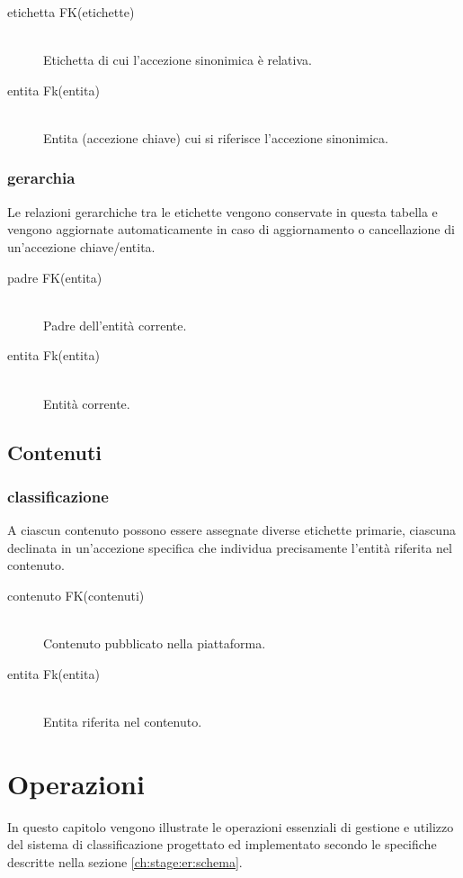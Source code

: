 \documentclass[10pt,a4paper,headinclude,footinclude,hidelinks]{scrreprt} %
\begin{document}
	\begin{description}
	\item[etichetta FK(etichette)] \hfill \\
	Etichetta di cui l'accezione sinonimica è relativa.
	\item[entita Fk(entita)] \hfill \\
	Entita (accezione chiave) cui si riferisce l'accezione sinonimica.
	\end{description}

	\subsection{gerarchia}
	Le relazioni gerarchiche tra le etichette vengono conservate in questa tabella e vengono aggiornate automaticamente in caso di aggiornamento o cancellazione di un'accezione chiave/entita.

	\begin{description}
	\item[padre FK(entita)] \hfill \\
	Padre dell'entità corrente.
	\item[entita Fk(entita)] \hfill \\
	Entità corrente.
	\end{description}

	\section{Contenuti}
	\subsection{classificazione}
	A ciascun contenuto possono essere assegnate diverse etichette primarie, ciascuna declinata in un'accezione specifica che individua precisamente l'entità riferita nel contenuto.

	\begin{description}
	\item[contenuto FK(contenuti)] \hfill \\
	Contenuto pubblicato nella piattaforma.
	\item[entita Fk(entita)] \hfill \\
	Entita riferita nel contenuto.
	\end{description}

	\chapter{Operazioni}
	\label{ch:stage:er:operazioni}
	In questo capitolo vengono illustrate le operazioni essenziali di gestione e utilizzo del sistema di classificazione progettato ed implementato secondo le specifiche descritte nella sezione \ref{ch:stage:er:schema}.
\end{document}
